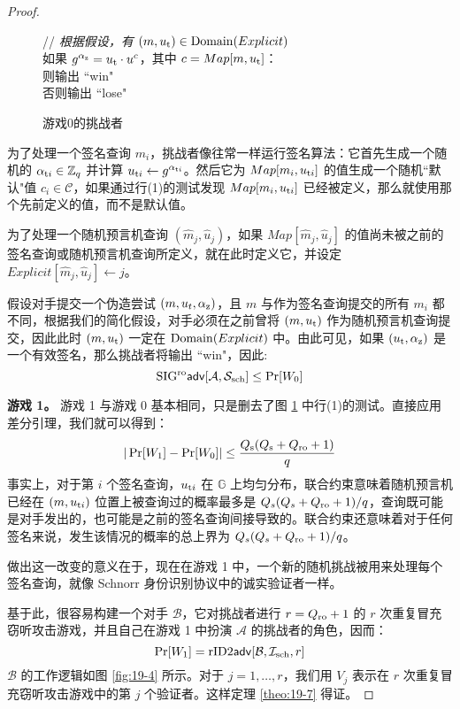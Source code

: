 \begin{proof}
\begin{figure}
  \hspace*{70pt} // \emph{根据假设，有 $(m,u_{\rm t})\in{\rm Domain}(Explicit)$}\\
  \hspace*{70pt} 如果 $g^{\alpha_{\rm z}}=u_{\rm t}\cdot u^c$，其中 $c=Map[m,u_{\rm t}]$：\\
  \hspace*{95pt} 则输出 ``win"\\
  \hspace*{95pt} 否则输出 ``lose"\\
  \caption{游戏0的挑战者}
  \label{fig:19-3}
\end{figure}

为了处理一个签名查询 $m_i$，挑战者像往常一样运行签名算法：它首先生成一个随机的 $\alpha_{{\rm t}i}\in\mathbb{Z}_q$ 并计算 $u_{{\rm t}i}\leftarrow g^{\alpha_{{\rm t}i}}$。然后它为 $Map[m_i,u_{{\rm t}i}]$ 的值生成一个随机``默认"值 $c_i\in\mathcal{C}$，如果通过行(1)的测试发现 $Map[m_i,u_{{\rm t}i}]$ 已经被定义，那么就使用那个先前定义的值，而不是默认值。

为了处理一个随机预言机查询 $(\widehat m_j,\widehat u_j)$，如果 $Map[\widehat m_j,\widehat u_j]$ 的值尚未被之前的签名查询或随机预言机查询所定义，就在此时定义它，并设定 $Explicit[\widehat m_j,\widehat u_j]\leftarrow j$。

假设对手提交一个伪造尝试 $(m,u_t,\alpha_{\rm z})$，且 $m$ 与作为签名查询提交的所有 $m_i$ 都不同，根据我们的简化假设，对手必须在之前曾将 $(m,u_{\rm t})$ 作为随机预言机查询提交，因此此时 $(m,u_{\rm t})$ 一定在 ${\rm Domain}(Explicit)$ 中。由此可见，如果 $(u_{\rm t},\alpha_{\rm z})$ 是一个有效签名，那么挑战者将输出 ``win"，因此:
\[
{\rm SIG^{ro}\mathsf{adv}}[\mathcal{A}, \mathcal{S}_{\rm sch}]\leq\Pr[W_0]
\]

\noindent
\textbf{游戏 1。}
游戏 1 与游戏 0 基本相同，只是删去了图 \ref{fig:19-3} 中行(1)的测试。直接应用差分引理，我们就可以得到：
\[
|\Pr[W_1]-\Pr[W_0]|\leq\frac{Q_{\rm s}(Q_{\rm s}+Q_{\rm ro}+1)}{q}
\]
事实上，对于第 $i$ 个签名查询，$u_{{\rm t}i}$ 在 $\mathbb{G}$ 上均匀分布，联合约束意味着随机预言机已经在 $(m,u_{{\rm t}i})$ 位置上被查询过的概率最多是 ${Q_s(Q_s+Q_{\rm ro}+1)}/{q}$，查询既可能是对手发出的，也可能是之前的签名查询间接导致的。联合约束还意味着对于任何签名来说，发生该情况的概率的总上界为 ${Q_s(Q_s+Q_{\rm ro}+1)}/{q}$。

做出这一改变的意义在于，现在在游戏 1 中，一个新的随机挑战被用来处理每个签名查询，就像 Schnorr 身份识别协议中的诚实验证者一样。

基于此，很容易构建一个对手 $\mathcal{B}$，它对挑战者进行 $r=Q_{\rm ro}+1$ 的 $r$ 次重复冒充窃听攻击游戏，并且自己在游戏 1 中扮演 $\mathcal{A}$ 的挑战者的角色，因而：
\[
\Pr[W_1] = {\rm rID2\mathsf{adv}}[\mathcal{B},\mathcal{I}_{\rm sch},r]
\]
$\mathcal{B}$ 的工作逻辑如图 \ref{fig:19-4} 所示。对于 $j=1,\dots,r$，我们用 $V_j$ 表示在 $r$ 次重复冒充窃听攻击游戏中的第 $j$ 个验证者。这样定理 \ref{theo:19-7} 得证。
\end{proof}

